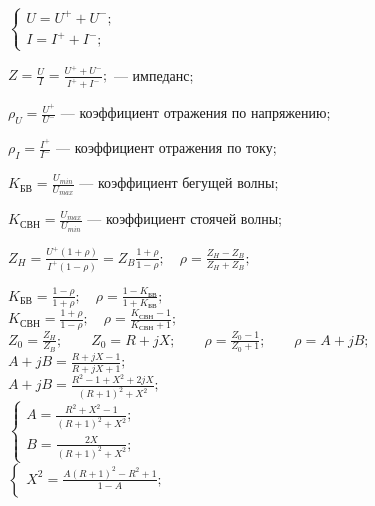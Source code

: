 \documentclass[12pt,a4paper]{article}
\begin{document}
	\thispagestyle{empty}
	$\begin{cases}
		U = U^+ + U^-; \\
		I = I^+ + I^-;
	\end{cases}$
	
	$\displaystyle Z = \frac{U}{I} = \frac{U^++U^-}{I^++I^-};$ \quad --- \quad импеданс;
	
	$\displaystyle \rho_U = \frac{U^+}{U^-}$ \quad --- \quad коэффициент отражения по напряжению;
	
	$\displaystyle \rho_I = \frac{I^+}{I^-}$ \quad --- \quad коэффициент отражения по току;
	
	$\displaystyle K_{\text{БВ}} = \frac{U_{min}}{U_{max}}$ \quad --- \quad коэффициент бегущей волны;
	
	$\displaystyle K_{\text{СВН}} = \frac{U_{max}}{U_{min}}$ \quad --- \quad коэффициент стоячей волны;
	
	$\displaystyle Z_H = \frac{U^+(1+\rho)}{I^+(1-\rho)} = Z_B \frac{1+\rho}{1-\rho}; \quad
	\rho = \frac{Z_H - Z_B}{Z_H + Z_B};$
	
	$\displaystyle K_{\text{БВ}} = \frac{1-\rho}{1+\rho}; \quad \rho = \frac{1-K_{\text{БВ}}}{1+K_{\text{БВ}}};$ \\
	
	$\displaystyle K_{\text{СВН}} = \frac{1+\rho}{1-\rho}; \quad \rho = \frac{K_{\text{СВН}}-1}{K_{\text{СВН}}+1};$ \\
	
	$\displaystyle Z_0 = \frac{Z_H}{Z_B}; \qquad Z_0 = R + jX; \qquad \rho = \frac{Z_0-1}{Z_0+1};
	\qquad \rho = A + jB; $ \\
	
	$\displaystyle A + jB = \frac{R + jX -1}{R + jX + 1};$ \\
	
	$\displaystyle A+jB = \frac{R^2-1+X^2+2jX}{(R+1)^2+X^2};$ \\
	
	$\begin{cases}
		A = \displaystyle\frac{R^2+X^2-1}{(R+1)^2+X^2}; \\
		B = \displaystyle\frac{2X}{(R+1)^2+X^2};
	\end{cases}$ \\
	
	$\begin{cases}
		X^2 = \displaystyle\frac{A(R+1)^2-R^2+1}{1-A}; \\
	\end{cases}$ \\
	
\end{document}

